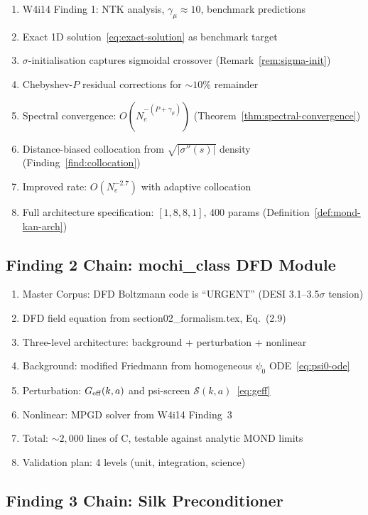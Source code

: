 \documentclass[11pt]{article}
\theoremstyle{definition}
\theoremstyle{remark}
\begin{document}
\begin{enumerate}[nosep]
\item W4i14 Finding 1: NTK analysis, $\gamma_\mu \approx 10$, benchmark predictions
\item Exact 1D solution~\eqref{eq:exact-solution} as benchmark target
\item $\sigma$-initialisation captures sigmoidal crossover (Remark~\ref{rem:sigma-init})
\item Chebyshev-$P$ residual corrections for $\sim 10\%$ remainder
\item Spectral convergence: $O(N_e^{-(P + \gamma_\mu)})$ (Theorem~\ref{thm:spectral-convergence})
\item Distance-biased collocation from $\sqrt{|\sigma''(s)|}$ density
  (Finding~\ref{find:collocation})
\item Improved rate: $O(N_e^{-2.7})$ with adaptive collocation
\item Full architecture specification: $[1,8,8,1]$, 400 params
  (Definition~\ref{def:mond-kan-arch})
\end{enumerate}

\subsection{Finding 2 Chain: mochi\_class DFD Module}

\begin{enumerate}[nosep]
\item Master Corpus: DFD Boltzmann code is ``URGENT'' (DESI 3.1--3.5$\sigma$ tension)
\item DFD field equation from section02\_formalism.tex, Eq.~(2.9)
\item Three-level architecture: background + perturbation + nonlinear
\item Background: modified Friedmann from homogeneous $\psi_0$ ODE~\eqref{eq:psi0-ode}
\item Perturbation: $G_{\rm eff}(k,a)$ and psi-screen $\mathcal{S}(k,a)$~\eqref{eq:geff}
\item Nonlinear: MPGD solver from W4i14 Finding~3
\item Total: $\sim 2{,}000$ lines of C, testable against analytic MOND limits
\item Validation plan: 4 levels (unit, integration, science)
\end{enumerate}

\subsection{Finding 3 Chain: Silk Preconditioner}
\end{document}
